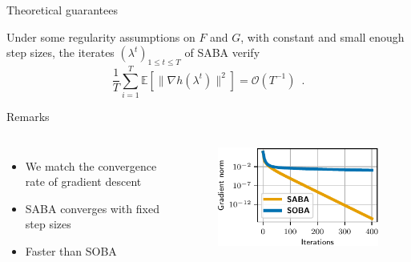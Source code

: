 \documentclass{beamer}
\begin{document}
\begin{frame}{Theoretical guarantees}
    \begin{theorem}
        Under some regularity assumptions on $F$ and $G$, with constant and small enough step sizes, the iterates $(\lambda^t)_{1\leq t\leq T}$ of SABA verify
        $$\frac1T\sum_{i=1}^T\mathbb E[\|\nabla h(\lambda^t)\|^2] = \mathcal O(T^{-1})\enspace .$$
    \end{theorem}

\end{frame}

\begin{frame}{Remarks}
    \begin{columns}
            \begin{itemize}
                \item We match the convergence rate of gradient descent

                \vspace{ .5cm}
                \item SABA converges with fixed step sizes

                \vspace{.5cm}
                \item Faster than SOBA
            \end{itemize}
        \begin{figure}
        \centering
        \includegraphics{images/toy.pdf}
    \end{figure}
    \end{columns}

\end{frame}
\end{document}
